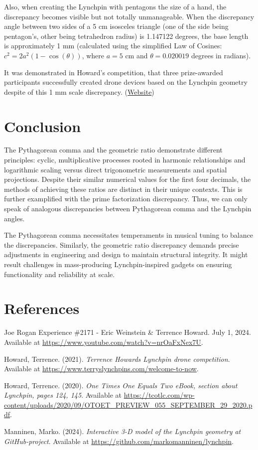 \documentclass[a4paper,12pt]{article}
\begin{document}
Also, when creating the Lynchpin with pentagons the size of a hand, the discrepancy becomes visible but not totally unmanageable. When the discrepancy angle between two sides of a 5 cm isosceles triangle (one of the side being pentagon's, other being tetrahedron radius) is 1.147122 degrees, the base length is approximately 1 mm (calculated using the simplified Law of Cosines: \( c^2 = 2a^2 (1 - \cos(\theta)) \), where \( a = 5 \) cm and \( \theta = 0.020019 \) degrees in radians).

It was demonstrated in Howard's competition, that three prize-awarded participants successfully created drone devices based on the Lynchpin geometry despite of this 1 mm scale discrepancy. (\href{https://www.terryslynchpins.com/welcome-to-now}{Website})


\section{Conclusion}
The Pythagorean comma and the geometric ratio demonstrate different principles: cyclic, multiplicative processes rooted in harmonic relationships and logarithmic scaling versus direct trigonometric measurements and spatial projections. Despite their similar numerical values for the first four decimals, the methods of achieving these ratios are distinct in their unique contexts. This is further examplified with the prime factorization discrepancy. Thus, we can only speak of analogous discrepancies between Pythagorean comma and the Lynchpin angles.

The Pythagorean comma necessitates temperaments in musical tuning to balance the discrepancies. Similarly, the geometric ratio discrepancy demands precise adjustments in engineering and design to maintain structural integrity. It might result challenges in mass-producing Lynchpin-inspired gadgets on ensuring functionality and reliability at scale.


\section{References}

\begin{thebibliography}{9}

Joe Rogan Experience \#2171 - Eric Weinstein \& Terrence Howard. July 1, 2024. Available at \url{https://www.youtube.com/watch?v=nrOaFxNex7U}.

Howard, Terrence. (2021). \emph{Terrence Howards Lynchpin drone competition}. Available at \url{https://www.terryslynchpins.com/welcome-to-now}.

Howard, Terrence. (2020). \emph{One Times One Equals Two eBook, section about Lynchpin, pages 124, 145}. Available at \url{https://tcotlc.com/wp-content/uploads/2020/09/OTOET_PREVIEW_055_SEPTEMBER_29_2020.pdf}.

Manninen, Marko. (2024). \emph{Interactive 3-D model of the Lynchpin geometry at GitHub-project}. Available at \url{https://github.com/markomanninen/lynchpin}.

\end{thebibliography}
\end{document}
